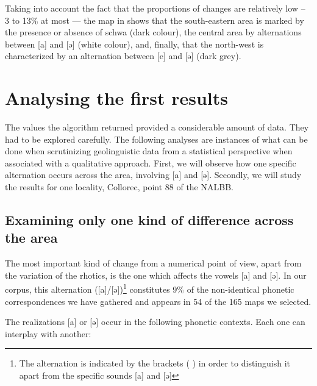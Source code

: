 \documentclass[output=paper]{LSP/langsci}
\begin{document}
Taking into account the fact that the proportions of changes are relatively low – 3 to 13\% at most — the map in  shows that the south-eastern area is marked by the presence or absence of schwa (dark colour), the central area by alternations between [a] and [ə] (white colour), and, finally, that the north-west is characterized by an alternation between [e] and [ə] (dark grey).

\section{Analysing the first results }

The values the algorithm returned provided a considerable amount of data. They had to be explored carefully. The following analyses are instances of what can be done when scrutinizing geolinguistic data from a statistical perspective when associated with a qualitative approach. First, we will observe how one specific alternation occurs across the area, involving [a] and [ə]. Secondly, we will study the results for one locality, Collorec, point 88 of the NALBB.

\subsection[Examining only one kind of difference across the area ]{Examining only one kind of difference across the area }

The most important kind of change from a numerical point of view, apart from the variation of the rhotics, is the one which affects the vowels [a] and [ə]. In our corpus, this alternation ([a]/[ə])\footnote{ The alternation is indicated by the brackets ( ) in order to distinguish it apart from the specific sounds [a] and [ə]} constitutes 9\% of the non-identical phonetic correspondences we have gathered and appears in 54 of the 165 maps we selected.

The realizations [a] or [ə] occur in the following phonetic contexts. Each one can interplay with another:
\end{document}
